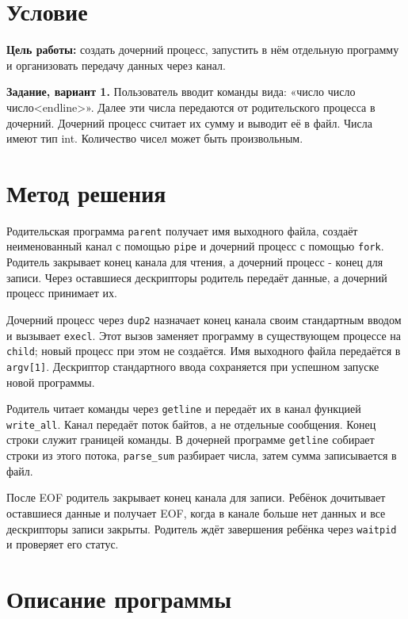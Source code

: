\documentclass[12pt,a4paper]{article}
\begin{document}


\section{Условие}
\textbf{Цель работы:} создать дочерний процесс, запустить в нём отдельную программу и организовать передачу данных через канал.

\textbf{Задание, вариант 1.} Пользователь вводит команды вида: «число число число<endline>». Далее эти числа передаются от родительского процесса в дочерний. Дочерний процесс считает их сумму и выводит её в файл. Числа имеют тип int. Количество чисел может быть произвольным.

\section{Метод решения}
Родительская программа \texttt{parent} получает имя выходного файла, создаёт неименованный канал с помощью \texttt{pipe} и дочерний процесс с помощью \texttt{fork}. Родитель закрывает конец канала для чтения, а дочерний процесс - конец для записи. Через оставшиеся дескрипторы родитель передаёт данные, а дочерний процесс принимает их.

Дочерний процесс через \texttt{dup2} назначает конец канала своим стандартным вводом и вызывает \texttt{execl}. Этот вызов заменяет программу в существующем процессе на \texttt{child}; новый процесс при этом не создаётся. Имя выходного файла передаётся в \texttt{argv[1]}. Дескриптор стандартного ввода сохраняется при успешном запуске новой программы.

Родитель читает команды через \texttt{getline} и передаёт их в канал функцией \texttt{write\_all}. Канал передаёт поток байтов, а не отдельные сообщения. Конец строки служит границей команды. В дочерней программе \texttt{getline} собирает строки из этого потока, \texttt{parse\_sum} разбирает числа, затем сумма записывается в файл.

После EOF родитель закрывает конец канала для записи. Ребёнок дочитывает оставшиеся данные и получает EOF, когда в канале больше нет данных и все дескрипторы записи закрыты. Родитель ждёт завершения ребёнка через \texttt{waitpid} и проверяет его статус.

\section{Описание программы}
\end{document}

